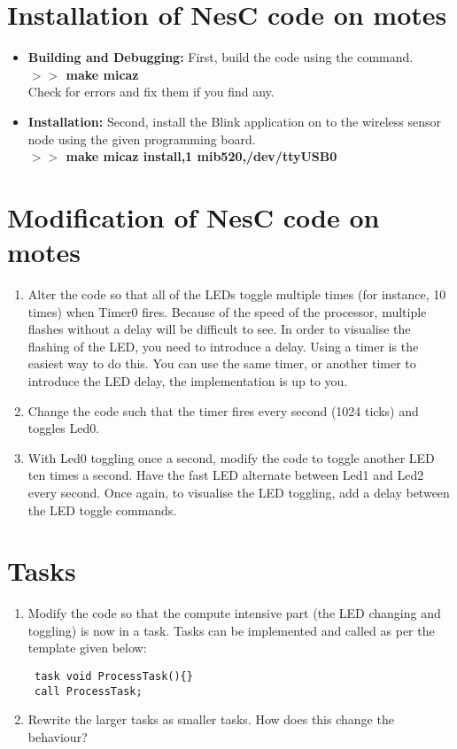 \documentclass [a4] {article}
\begin{document}
\section{Installation of NesC code on motes}

\begin{itemize}
\item \textbf{Building and Debugging:} First, build the code using the command. \\
\textbf{$>>$ make micaz}\\
Check for errors and fix them if you find any.
\item \textbf{Installation:} Second, install the Blink application on to the wireless sensor node using the given programming board.\\
\bf{$>>$ make micaz install,1 mib520,/dev/ttyUSB0}
\end{itemize}

\section{Modification of NesC code on motes}
\begin{enumerate}

\item Alter the code so that all of the LEDs toggle multiple times (for instance, 10 times) when Timer0 fires. Because of the speed of the processor, multiple flashes without a delay will be difficult to see. In order to visualise the flashing of the LED, you need to introduce a delay. Using a timer is the easiest way to do this. You can use the same timer, or another timer to introduce the LED delay, the implementation is up to you.

\item Change the code such that the timer fires every second (1024 ticks) and toggles Led0.

\item With Led0 toggling once a second, modify the code to toggle another LED ten times a second. Have the fast LED alternate between Led1 and Led2 every second. Once again, to visualise the LED toggling, add a delay between the LED toggle commands.

\end{enumerate}

\section{Tasks}

\begin{enumerate}

\item Modify the code so that the compute intensive part (the LED changing and toggling) is now in a task. Tasks can be implemented and called as per the template given below:

\begin{verbatim}
 task void ProcessTask(){}
 call ProcessTask;
\end{verbatim}

\item Rewrite the larger tasks as smaller tasks. How does this change the behaviour? 
\end{enumerate}
\end{document}
